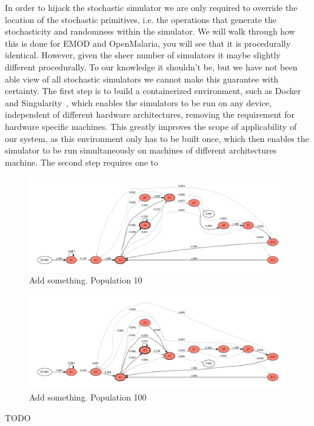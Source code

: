 \documentclass{article}
\begin{document}
In order to hijack the stochastic simulator we are only required to override the location of the stochastic primitives, i.e. the operations that generate the stochasticity and randomness within the simulator. 
We will walk through how this is done for EMOD and OpenMalaria, you will see that it is procedurally identical.
However, given the sheer number of simulators it maybe slightly different procedurally. 
To our knowledge it shouldn't be, but we have not been able view of all stochastic simulators we cannot make this guarantee with certainty. 
The first step is to build a containerized environment, such as Docker~\cite{merkel2014docker} and Singularity~\cite{kurtzer2017singularity}, which enables the simulators to be run on any device, independent of different hardware architectures, removing the requirement for hardware specific machines. 
This greatly improves the scope of applicability of our system, as this environment only has to be built once, which then enables the simulator to be run simultaneously on machines of different architectures machine. 
The second step requires one to 



\begin{figure}[h!]
	\centering
	\includegraphics[width=\textwidth]{../plots/ewan_25_pop_10.pdf}
	\caption{Add something. Population 10}
\end{figure}
\begin{figure}[h!]
	\centering
	\includegraphics[width=\textwidth]{../plots/ewan_25_pop_100.pdf}
	\caption{Add something. Population 100}
\end{figure}
TODO
\end{document}
